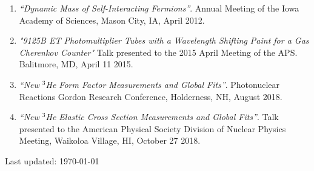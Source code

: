 \documentclass[letterpaper,10pt]{article}
\def\footerlink{}
\renewenvironment{itemize}{
  \begin{list}{}{
    \setlength{\leftmargin}{1.5em}
  }
}{
  \end{list}
}
\begin{document}
{	\begin{enumerate}\itemsep1pt \parskip2pt 
		\setcounter{enumi}{0}
		\item \textit{``Dynamic Mass of Self-Interacting Fermions''}. Annual Meeting of the Iowa Academy of Sciences, Mason City, IA, April 2012.

		\item \textit{"9125B ET Photomultiplier Tubes with a Wavelength Shifting Paint for a Gas Cherenkov Counter"} Talk presented to the 2015 April Meeting of the APS. Balitmore, MD, April 11 2015. 
		
		\item \textit{``New $^3$He Form Factor Measurements and Global Fits''}. Photonuclear Reactions Gordon Research Conference, Holderness, NH, August 2018.
		
		\item \textit{``New $^3$He Elastic Cross Section Measurements and Global Fits''}. Talk presented to the American Physical Society Division of Nuclear Physics Meeting, Waikoloa Village, HI, October 27 2018.
	\end{enumerate}


\bigskip
\begin{center}
  \begin{footnotesize}
    Last updated: \today \\
    \href{\footerlink}{\texttt{\footerlink}}
  \end{footnotesize}
\end{center}
}
\end{document}
